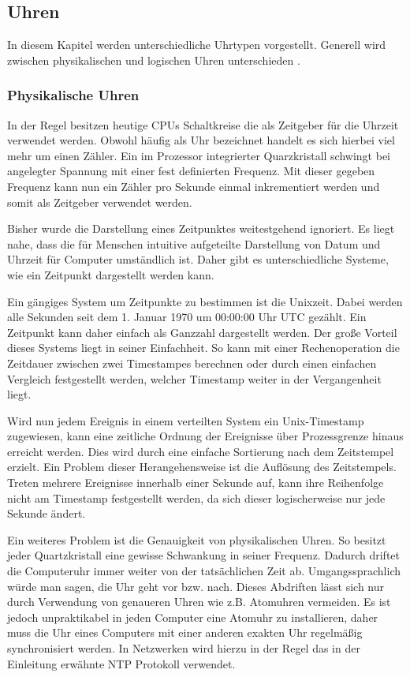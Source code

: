 \subsection{Uhren}
In diesem Kapitel werden unterschiedliche Uhrtypen vorgestellt.
Generell wird zwischen physikalischen und logischen Uhren unterschieden \cite{Tanenbaum2007}. 
\subsubsection{Physikalische Uhren}
In der Regel besitzen heutige CPUs Schaltkreise die als Zeitgeber für die Uhrzeit verwendet werden.
Obwohl häufig als Uhr bezeichnet handelt es sich hierbei viel mehr um einen Zähler.
Ein im Prozessor integrierter Quarzkristall schwingt bei angelegter Spannung mit einer fest definierten Frequenz.
Mit dieser gegeben Frequenz kann nun ein Zähler pro Sekunde einmal inkrementiert werden und somit als Zeitgeber verwendet werden.

Bisher wurde die Darstellung eines Zeitpunktes weitestgehend ignoriert. Es liegt nahe, dass die für Menschen intuitive aufgeteilte Darstellung von Datum und Uhrzeit für Computer umständlich ist. Daher gibt es unterschiedliche Systeme, wie ein Zeitpunkt dargestellt werden kann.

Ein gängiges System um Zeitpunkte zu bestimmen ist die Unixzeit.
Dabei werden alle Sekunden seit dem 1. Januar 1970 um 00:00:00 Uhr UTC gezählt.
Ein Zeitpunkt kann daher einfach als Ganzzahl dargestellt werden.
Der große Vorteil dieses Systems liegt in seiner Einfachheit.
So kann mit einer Rechenoperation die Zeitdauer zwischen zwei Timestampes berechnen oder durch einen einfachen Vergleich festgestellt werden, welcher Timestamp weiter in der Vergangenheit liegt.

Wird nun jedem Ereignis in einem verteilten System ein Unix-Timestamp zugewiesen, kann eine zeitliche Ordnung der Ereignisse über Prozessgrenze hinaus erreicht werden. Dies wird durch eine einfache Sortierung nach dem Zeitstempel erzielt.
Ein Problem dieser Herangehensweise ist die Auflösung des Zeitstempels. Treten mehrere Ereignisse innerhalb einer Sekunde auf, kann ihre Reihenfolge nicht am Timestamp festgestellt werden, da sich dieser logischerweise nur jede Sekunde ändert.

Ein weiteres Problem ist die Genauigkeit von physikalischen Uhren.
So besitzt jeder Quartzkristall eine gewisse Schwankung in seiner Frequenz.
Dadurch driftet die Computeruhr immer weiter von der tatsächlichen Zeit ab.
Umgangssprachlich würde man sagen, die Uhr geht vor bzw. nach.
Dieses Abdriften lässt sich nur durch Verwendung von genaueren Uhren wie z.B. Atomuhren vermeiden.
Es ist jedoch unpraktikabel in jeden Computer eine Atomuhr zu installieren, daher muss die Uhr eines Computers mit einer anderen exakten Uhr regelmäßig synchronisiert werden.
In Netzwerken wird hierzu in der Regel das in der Einleitung erwähnte NTP Protokoll verwendet.

